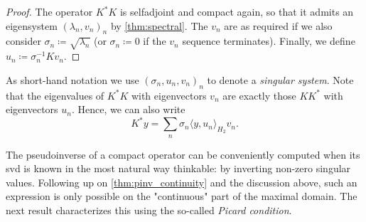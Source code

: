 \begin{lemma}
\begin{proof}
    The operator $K^* K$ is selfadjoint and compact again, so 
    that it admits an eigensystem $(\lambda_n, v_n)_n$
    by \cref{thm:spectral}.
    The $v_n$ are as required if we also consider 
    $\sigma_n \coloneqq \sqrt{\lambda_n}$ 
    (or $\sigma_n \coloneqq 0$ if the $v_n$ sequence terminates).
    Finally, we define 
    $u_n \coloneqq \sigma_n^{-1} K v_n$.
\end{proof}
As short-hand notation we use $(\sigma_n,u_n,v_n)_n$ to denote a
\emph{singular system}.
Note that the eigenvalues of $K^*K$ with eigenvectors $v_n$ 
are exactly those $KK^*$ with eigenvectors $u_n$.
Hence, we can also write
\begin{equation*}
    K^* y = \sum_n \sigma_n \langle y, u_n \rangle_{H_2} v_n.
\end{equation*}

The pseudoinverse of a compact operator can be conveniently 
computed when its svd is known in the most natural way thinkable:
by inverting non-zero singular values.
Following up on \cref{thm:pinv_continuity} and the discussion 
above, such an expression is only possible on the "continuous"
part of the maximal domain.
The next result characterizes this using the so-called 
\emph{Picard condition}.


\end{lemma}

